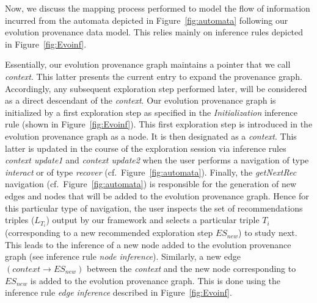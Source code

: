 Now, we discuss the mapping process performed to model the flow of information incurred from the automata depicted in Figure~\ref{fig:automata} following our evolution provenance data model.
This relies mainly on inference rules depicted in Figure~\ref{fig:Evoinf}.




Essentially, our evolution provenance graph maintains a pointer that we call \emph{context}. This latter presents the current entry to expand the provenance graph. Accordingly, any subsequent exploration step performed later, will be considered as a direct descendant of the \emph{context}.
Our evolution provenance graph is initialized by a first exploration step as specified in the \emph{Initialization} inference rule (shown in Figure~\ref{fig:Evoinf}). This first exploration step is introduced in the evolution provenance graph as a node. It is then designated as a \emph{context}. 
This latter is updated in the course of the exploration session via inference rules \emph{context update1} and \emph{context update2} when the user performs a navigation of type \emph{interact} or of type \emph{recover} (cf.~Figure~\ref{fig:automata}).
Finally, the \emph{getNextRec} navigation (cf.~Figure~\ref{fig:automata}) is responsible for the generation of new edges and nodes that will be added to the evolution provenance graph.
Hence for this particular type of navigation, the user inspects the set of recommendations triples ($L_{T_i}$) output by our framework and selects a particular triple $T_i$ (corresponding to a new recommended exploration step $ES_{new}$) to study next. This leads to the inference of a new node added to the evolution provenance graph (see inference rule \emph{node inference}).
Similarly, a new edge $(context \rightarrow ES_{new})$ between the \emph{context} and the new node corresponding to $ES_{new}$ is added to the evolution provenance graph.
This is done using the inference rule \emph{edge inference} described in Figure~\ref{fig:Evoinf}.



